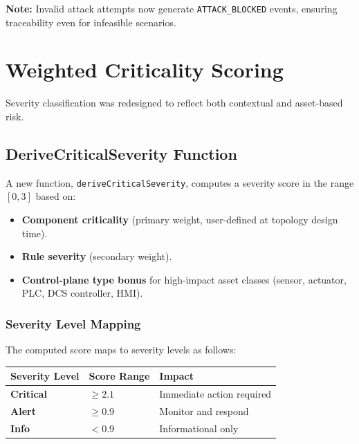 \documentclass[12pt]{article}
\begin{document}
\begin{tcolorbox}[colback=lightgray, colframe=secondary, boxrule=1pt, arc=3pt, left=8pt, right=8pt]
\textbf{\color{secondary}Note:} Invalid attack attempts now generate \texttt{ATTACK\_BLOCKED} events, ensuring traceability even for infeasible scenarios.
\end{tcolorbox}

\section{Weighted Criticality Scoring}

Severity classification was redesigned to reflect both contextual and asset-based risk.

\subsection{DeriveCriticalSeverity Function}

A new function, \texttt{deriveCriticalSeverity}, computes a severity score in the range $[0, 3]$ based on:

\begin{itemize}[leftmargin=1.5em]
\item \textbf{Component criticality} (primary weight, user-defined at topology design time).
\item \textbf{Rule severity} (secondary weight).
\item \textbf{Control-plane type bonus} for high-impact asset classes (sensor, actuator, PLC, DCS controller, HMI).
\end{itemize}

\subsubsection{Severity Level Mapping}

The computed score maps to severity levels as follows:

\begin{center}
\begin{tabular}{|l|l|l|}
\toprule
\textbf{Severity Level} & \textbf{Score Range} & \textbf{Impact} \\
\midrule
\cellcolor{lightgray}\textbf{Critical} & $\geq 2.1$ & Immediate action required \\
\cellcolor{lightgray}\textbf{Alert} & $\geq 0.9$ & Monitor and respond \\
\cellcolor{lightgray}\textbf{Info} & $< 0.9$ & Informational only \\
\bottomrule
\end{tabular}
\end{center}
\end{document}
